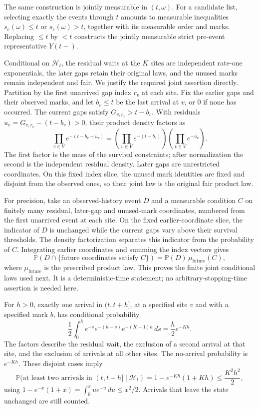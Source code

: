 \documentclass[
  11pt,
  a4paper,
]{article}
\begin{document}
The same construction is jointly measurable in \((t,\omega)\). For a
candidate list, selecting exactly the events through \(t\) amounts to
measurable inequalities \(s_e(\omega)\leq t\) or \(s_e(\omega)>t\),
together with its measurable order and marks. Replacing \(\leq t\) by
\(<t\) constructs the jointly measurable strict pre-event representative
\(Y(t-)\).

Conditional on \(\mathcal H_t\), the residual waits at the \(K\) sites
are independent rate-one exponentials, the later gaps retain their
original laws, and the unused marks remain independent and fair. We
justify the required joint assertion directly. Partition by the first
unarrived gap index \(r_v\) at each site. Fix the earlier gaps and their
observed marks, and let \(b_v\leq t\) be the last arrival at \(v\), or
\(0\) if none has occurred. The current gaps satisfy
\(G_{v,r_v}>t-b_v\). With residuals \(u_v=G_{v,r_v}-(t-b_v)>0\), their
product density factors as \[
\prod_{v\in V}e^{-(t-b_v+u_v)}
=\left(\prod_{v\in V}e^{-(t-b_v)}\right)
 \left(\prod_{v\in V}e^{-u_v}\right).
\] The first factor is the mass of the survival constraints; after
normalization the second is the independent residual density. Later gaps
are unrestricted coordinates. On this fixed index slice, the unused mark
identities are fixed and disjoint from the observed ones, so their joint
law is the original fair product law.

For precision, take an observed-history event \(D\) and a measurable
condition \(C\) on finitely many residual, later-gap and unused-mark
coordinates, numbered from the first unarrived event at each site. On
the fixed earlier-coordinate slice, the indicator of \(D\) is unchanged
while the current gaps vary above their survival thresholds. The density
factorization separates this indicator from the probability of \(C\).
Integrating earlier coordinates and summing the index vectors gives \[
\mathbb P(D\cap\{\text{future coordinates satisfy }C\})
=\mathbb P(D)\,\mu_{\mathrm{future}}(C),
\] where \(\mu_{\mathrm{future}}\) is the prescribed product law. This
proves the finite joint conditional laws used next. It is a
deterministic-time statement; no arbitrary-stopping-time assertion is
needed here.

For \(h>0\), exactly one arrival in \((t,t+h]\), at a specified site
\(v\) and with a specified mark \(b\), has conditional probability \[
\frac12\int_0^h e^{-s}e^{-(h-s)}e^{-(K-1)h}\,ds
=\frac h2e^{-Kh}.
\tag{FM2}
\] The factors describe the residual wait, the exclusion of a second
arrival at that site, and the exclusion of arrivals at all other sites.
The no-arrival probability is \(e^{-Kh}\). These disjoint cases imply \[
\mathbb P(\text{at least two arrivals in }(t,t+h]\mid\mathcal H_t)
=1-e^{-Kh}(1+Kh)\leq\frac{K^2h^2}{2},
\tag{FM3}
\] using \(1-e^{-x}(1+x)=\int_0^x u e^{-u}\,du\leq x^2/2\). Arrivals
that leave the state unchanged are still counted.
\end{document}
